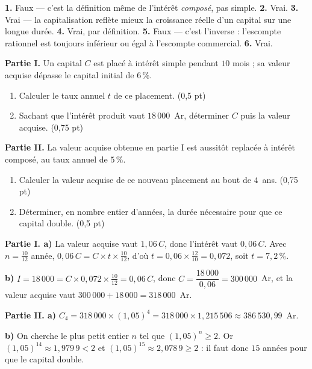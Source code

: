\begin{corrige}[je me teste]
\textbf{1.} Faux — c'est la définition même de l'intérêt \emph{composé}, pas
simple.
\textbf{2.} Vrai.
\textbf{3.} Vrai — la capitalisation reflète mieux la croissance réelle d'un
capital sur une longue durée.
\textbf{4.} Vrai, par définition.
\textbf{5.} Faux — c'est l'inverse : l'escompte rationnel est toujours
inférieur ou égal à l'escompte commercial.
\textbf{6.} Vrai.
\end{corrige}

\begin{commeaubac}
\textbf{Partie I.} Un capital $C$ est placé à intérêt simple pendant
$10$ mois ; sa valeur acquise dépasse le capital initial de $6\,\%$.
\begin{enumerate}[label=\textbf{\alph*)}, leftmargin=*, itemsep=0.15em]
  \item Calculer le taux annuel $t$ de ce placement. \hfill\textup{(0,5 pt)}
  \item Sachant que l'intérêt produit vaut $18\,000$~Ar, déterminer $C$ puis
        la valeur acquise. \hfill\textup{(0,75 pt)}
\end{enumerate}

\textbf{Partie II.} La valeur acquise obtenue en partie I est aussitôt
replacée à intérêt composé, au taux annuel de $5\,\%$.
\begin{enumerate}[label=\textbf{\alph*)}, leftmargin=*, itemsep=0.15em]
  \item Calculer la valeur acquise de ce nouveau placement au bout de
        $4$~ans. \hfill\textup{(0,75 pt)}
  \item Déterminer, en nombre entier d'années, la durée nécessaire pour que
        ce capital double. \hfill\textup{(0,5 pt)}
\end{enumerate}
\end{commeaubac}

\begin{corrige}
\textbf{Partie I. a)} La valeur acquise vaut $1{,}06\,C$, donc l'intérêt
vaut $0{,}06\,C$. Avec $n = \frac{10}{12}$ année,
$0{,}06\,C = C \times t \times \frac{10}{12}$, d'où
$t = 0{,}06 \times \frac{12}{10} = 0{,}072$, soit $t = 7{,}2\,\%$.

\textbf{b)} $I = 18\,000 = C \times 0{,}072 \times \frac{10}{12}
= 0{,}06\,C$, donc $C = \dfrac{18\,000}{0{,}06} = 300\,000$~Ar, et la valeur
acquise vaut $300\,000+18\,000 = 318\,000$~Ar.

\textbf{Partie II. a)} $C_{4} = 318\,000 \times (1{,}05)^{4}
= 318\,000 \times 1{,}215\,506 \approx 386\,530{,}99$~Ar.

\textbf{b)} On cherche le plus petit entier $n$ tel que
$(1{,}05)^{n} \geq 2$. Or $(1{,}05)^{14} \approx 1{,}979\,9<2$ et
$(1{,}05)^{15} \approx 2{,}078\,9 \geq 2$ : il faut donc $15$ années pour que
le capital double.
\end{corrige}

